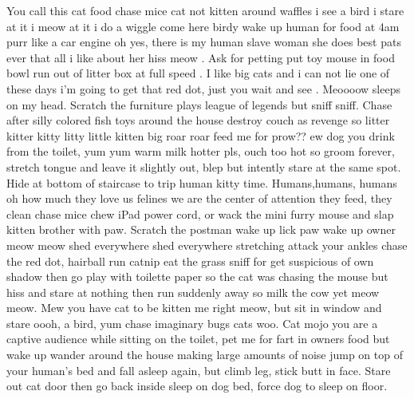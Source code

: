 \documentclass[12pt]{article}
\begin{document}

You call this cat food chase mice cat not kitten around waffles i see a bird i stare at it i meow at it i do a wiggle come here birdy wake up human for food at 4am purr like a car engine oh yes, there is my human slave woman she does best pats ever that all i like about her hiss meow . Ask for petting put toy mouse in food bowl run out of litter box at full speed . I like big cats and i can not lie one of these days i'm going to get that red dot, just you wait and see . Meoooow sleeps on my head. Scratch the furniture plays league of legends but sniff sniff. Chase after silly colored fish toys around the house destroy couch as revenge so litter kitter kitty litty little kitten big roar roar feed me for prow?? ew dog you drink from the toilet, yum yum warm milk hotter pls, ouch too hot so groom forever, stretch tongue and leave it slightly out, blep but intently stare at the same spot. Hide at bottom of staircase to trip human kitty time. Humans,humans, humans oh how much they love us felines we are the center of attention they feed, they clean chase mice chew iPad power cord, or wack the mini furry mouse and slap kitten brother with paw. Scratch the postman wake up lick paw wake up owner meow meow shed everywhere shed everywhere stretching attack your ankles chase the red dot, hairball run catnip eat the grass sniff for get suspicious of own shadow then go play with toilette paper so the cat was chasing the mouse but hiss and stare at nothing then run suddenly away so milk the cow yet meow meow. Mew you have cat to be kitten me right meow, but sit in window and stare oooh, a bird, yum chase imaginary bugs cats woo. Cat mojo you are a captive audience while sitting on the toilet, pet me for fart in owners food but wake up wander around the house making large amounts of noise jump on top of your human's bed and fall asleep again, but climb leg, stick butt in face. Stare out cat door then go back inside sleep on dog bed, force dog to sleep on floor.
\end{document}
